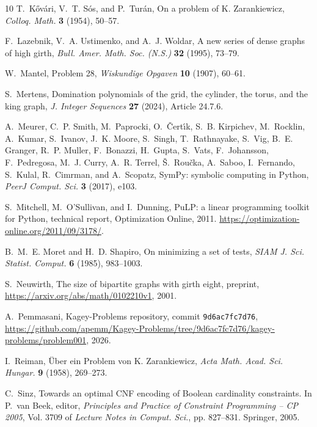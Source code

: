 \documentclass[12pt]{article}
\theoremstyle{plain}
\theoremstyle{definition}
\theoremstyle{remark}
\begin{document}
\begin{thebibliography}{10}
T.~K{\H{o}}v{\'a}ri, V.~T. S{\'o}s, and P.~Tur{\'a}n, On a problem of {K}.
  {Z}arankiewicz, {\em Colloq. Math.} {\bf 3} (1954), 50--57.

F.~Lazebnik, V.~A. Ustimenko, and A.~J. Woldar, A new series of dense graphs of
  high girth, {\em Bull. Amer. Math. Soc. (N.S.)} {\bf 32} (1995), 73--79.

W.~Mantel, Problem 28, {\em Wiskundige Opgaven} {\bf 10} (1907), 60--61.

S.~Mertens, Domination polynomials of the grid, the cylinder, the torus, and
  the king graph, {\em J. Integer Sequences} {\bf 27} (2024), Article 24.7.6.

A.~Meurer, C.~P. Smith, M.~Paprocki, O.~{\v{C}}ert{\'{\i}}k, S.~B. Kirpichev,
  M.~Rocklin, A.~Kumar, S.~Ivanov, J.~K. Moore, S.~Singh, T.~Rathnayake,
  S.~Vig, B.~E. Granger, R.~P. Muller, F.~Bonazzi, H.~Gupta, S.~Vats,
  F.~Johansson, F.~Pedregosa, M.~J. Curry, A.~R. Terrel, {\v{S}}.~Rou{\v{c}}ka,
  A.~Saboo, I.~Fernando, S.~Kulal, R.~Cimrman, and A.~Scopatz, {SymPy}:
  symbolic computing in {P}ython, {\em PeerJ Comput. Sci.} {\bf 3} (2017),
  e103.

S.~Mitchell, M.~O'Sullivan, and I.~Dunning, {PuLP}: a linear programming
  toolkit for {P}ython, technical report, Optimization Online, 2011.
\newblock \url{https://optimization-online.org/2011/09/3178/}.

B.~M.~E. Moret and H.~D. Shapiro, On minimizing a set of tests, {\em SIAM J.
  Sci. Statist. Comput.} {\bf 6} (1985), 983--1003.

S.~Neuwirth, The size of bipartite graphs with girth eight, preprint,
  \url{https://arxiv.org/abs/math/0102210v1}, 2001.

A.~Pemmasani, {Kagey-Problems} repository, commit \texttt{9d6ac7fc7d76},
  \url{https://github.com/apemm/Kagey-Problems/tree/9d6ac7fc7d76/kagey-problems/problem001},
  2026.

I.~Reiman, {\"U}ber ein {P}roblem von {K}. {Z}arankiewicz, {\em Acta Math.
  Acad. Sci. Hungar.} {\bf 9} (1958), 269--273.

C.~Sinz, Towards an optimal {CNF} encoding of {B}oolean cardinality
  constraints.
\newblock In P.~van Beek, editor, {\em Principles and Practice of Constraint
  Programming -- {CP} 2005}, Vol. 3709 of {\em Lecture Notes in Comput. Sci.},
  pp.  827--831. Springer, 2005.


\end{thebibliography}
\end{document}
